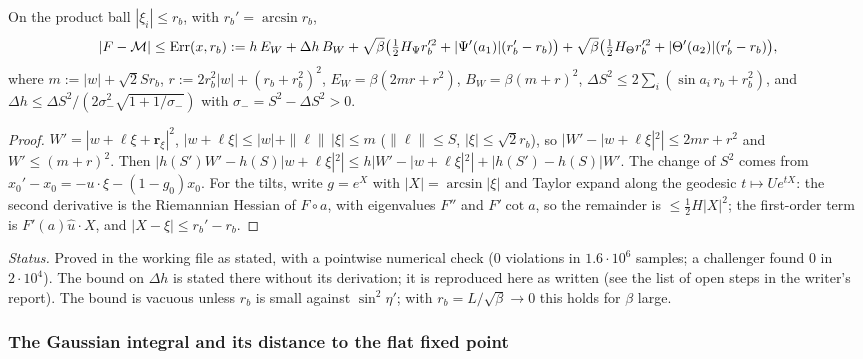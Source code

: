 \begin{lemma}\label{tu:L-taylor}
On the product ball $|\xi_i|\le r_b$, with $r_b'=\arcsin r_b$,
\[
|F-\mathcal M|\le{\rm Err}(x,r_b):=h\,E_W+\Delta h\,B_W+\sqrt\beta\big(\tfrac12H_\Psi r_b'^2+|\Psi'(a_1)|(r_b'-r_b)\big)
+\sqrt\beta\big(\tfrac12H_\Theta r_b'^2+|\Theta'(a_2)|(r_b'-r_b)\big),
\]
where $m:=|w|+\sqrt2Sr_b$, $r:=2r_b^2|w|+(r_b+r_b^2)^2$, $E_W=\beta(2mr+r^2)$, $B_W=\beta(m+r)^2$,
$\Delta S^2\le2\sum_i(\sin a_i\,r_b+r_b^2)$, and $\Delta h\le\Delta S^2/(2\sigma_-^2\sqrt{1+1/\sigma_-})$ with
$\sigma_-=S^2-\Delta S^2>0$.
\end{lemma}

\begin{proof}
$W'=|w+\ell\xi+\mathbf r_\xi|^2$, $|w+\ell\xi|\le|w|+\|\ell\|\,|\xi|\le m$ ($\|\ell\|\le S$, $|\xi|\le\sqrt2r_b$),
so $|W'-|w+\ell\xi|^2|\le2mr+r^2$ and $W'\le(m+r)^2$. Then
$|h(S')W'-h(S)|w+\ell\xi|^2|\le h|W'-|w+\ell\xi|^2|+|h(S')-h(S)|W'$. The change of $S^2$ comes from
$x_0'-x_0=-u\cdot\xi-(1-g_0)x_0$. For the tilts, write $g=e^X$ with $|X|=\arcsin|\xi|$ and Taylor expand along the
geodesic $t\mapsto Ue^{tX}$: the second derivative is the Riemannian Hessian of $F\circ a$, with eigenvalues
$F''$ and $F'\cot a$, so the remainder is $\le\frac12H|X|^2$; the first-order term is $F'(a)\hat u\cdot X$, and
$|X-\xi|\le r_b'-r_b$.
\end{proof}

\noindent\emph{Status.} Proved in the working file as stated, with a pointwise numerical check
($0$ violations in $1.6\cdot10^6$ samples; a challenger found $0$ in $2\cdot10^4$). The bound on
$\Delta h$ is stated there without its derivation; it is reproduced here as written (see the list of
open steps in the writer's report). The bound is vacuous unless $r_b$ is small against $\sin^2\eta'$;
with $r_b=L/\sqrt\beta\to0$ this holds for $\beta$ large.

\subsubsection*{The Gaussian integral and its distance to the flat fixed point}

